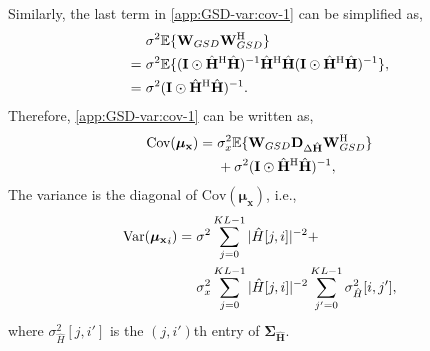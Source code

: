 \documentclass[journal]{IEEEtran}
\newcommand{\HT}{^{\mathrm{H}}} %
\begin{document}
Similarly, the last term in \eqref{app:GSD-var:cov-1} can be simplified as,
\begin{equation}
\begin{split}
 \hspace{0.3em}&\sigma^2\mathbb{E}\{ {\mathbf W}_{GSD}{\mathbf W}_{GSD}\HT \} \\
=\hspace{0.3em} & \sigma^2\mathbb{E}\{(\mathbf I\odot\hat{\mathbf H}\HT \hat{\mathbf H})^{-1}\hat{\mathbf H}\HT \hat{\mathbf H} (\mathbf I\odot\hat{\mathbf H}\HT \hat{\mathbf H})^{-1} \}, \\
=\hspace{0.3em} & \sigma^2(\mathbf I\odot \hat{\mathbf H}\HT \hat{\mathbf H})^{-1}.
\end{split}
\end{equation}
Therefore, \eqref{app:GSD-var:cov-1} can be written as,
\begin{equation}
\begin{split}
\text{Cov}({\bm\mu}_{\mathbf x}) = \hspace{0.3em}& \sigma_x^2\mathbb{E}\{\mathbf W_{GSD} \mathbf D_{\Delta \hat{\mathbf H}}{\mathbf W}_{GSD}\HT\} \\
& + \sigma^2(\mathbf I\odot\hat{\mathbf H}\HT \hat{\mathbf H})^{-1},
\end{split}
\end{equation}
The variance is the diagonal of $\text{Cov}(\bm\mu_{\mathbf x})$, i.e.,
\begin{equation}
\begin{split}
\text{Var}({{\boldsymbol{\mu}}_{\mathbf x}}_i) = \hspace{0.3em}  & \sigma^2 \sum_{j=0}^{KL-1} |\hat{H}[j, i]|^{-2} + \\ 
& \sigma_x^2 \sum_{j=0}^{KL-1} |\hat{H}[j, i]|^{-2} \sum_{j'=0}^{KL-1} \sigma^2_{\hat{H}}[i, j'],
\end{split}
\end{equation}
where $\sigma^2_{\hat{H}}[j, i']$ is the $(j, i')$th entry of $\bm \Sigma_{\hat{\mathbf H}}$.
\end{document}

